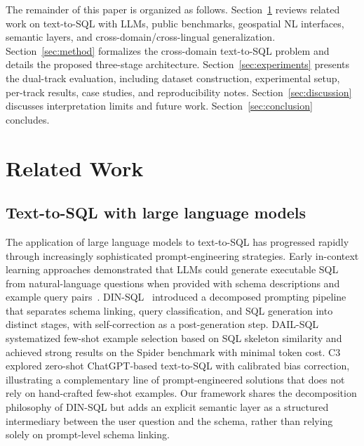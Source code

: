 \documentclass[11pt]{article}
\begin{document}
The remainder of this paper is organized as follows. Section~\ref{sec:related} reviews related work on text-to-SQL with LLMs, public benchmarks, geospatial NL interfaces, semantic layers, and cross-domain/cross-lingual generalization. Section~\ref{sec:method} formalizes the cross-domain text-to-SQL problem and details the proposed three-stage architecture. Section~\ref{sec:experiments} presents the dual-track evaluation, including dataset construction, experimental setup, per-track results, case studies, and reproducibility notes. Section~\ref{sec:discussion} discusses interpretation limits and future work. Section~\ref{sec:conclusion} concludes.

\section{Related Work}
\label{sec:related}

\subsection{Text-to-SQL with large language models}

The application of large language models to text-to-SQL has progressed rapidly through increasingly sophisticated prompt-engineering strategies. Early in-context learning approaches demonstrated that LLMs could generate executable SQL from natural-language questions when provided with schema descriptions and example query pairs~\cite{yu2018spider,rajkumar2022evaluating}. DIN-SQL~\cite{pourreza2023dinsql} introduced a decomposed prompting pipeline that separates schema linking, query classification, and SQL generation into distinct stages, with self-correction as a post-generation step. DAIL-SQL~\cite{gao2024dail} systematized few-shot example selection based on SQL skeleton similarity and achieved strong results on the Spider benchmark with minimal token cost. C3~\cite{dong2023c3} explored zero-shot ChatGPT-based text-to-SQL with calibrated bias correction, illustrating a complementary line of prompt-engineered solutions that does not rely on hand-crafted few-shot examples. Our framework shares the decomposition philosophy of DIN-SQL but adds an explicit semantic layer as a structured intermediary between the user question and the schema, rather than relying solely on prompt-level schema linking.
\end{document}
